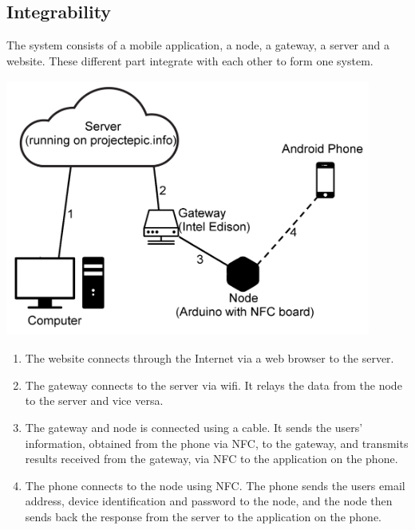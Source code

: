 \subsection{Integrability}
The system consists of a mobile application, a node, a gateway, a server and a website. These different part integrate with each other to form one system. 

\includegraphics[width=12cm, height=8.5cm]{SystemLayout}
\begin{enumerate}
\item The website connects through the Internet via a web browser to the server. 
\item The gateway connects to the server via wifi. It relays the data from the node to the server and vice versa.
\item The gateway and node is connected using a cable. It sends the users' information, obtained from the phone via NFC, to the gateway, and transmits results  received from the gateway, via NFC to the application on the phone.
\item The phone connects to the node using NFC. The phone sends the users email address, device identification and password to the node, and the node then sends back the response from the server to the application on the phone.
\end{enumerate}



